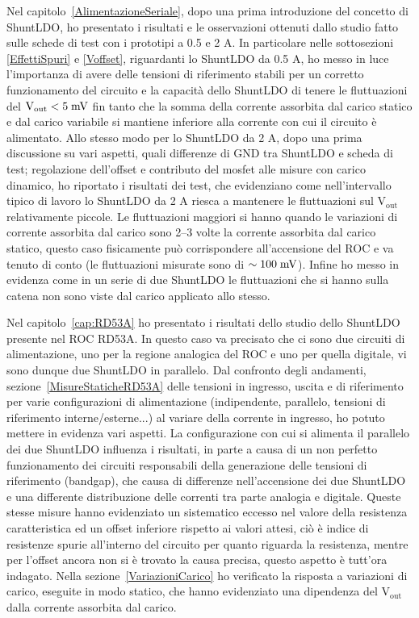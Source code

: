Nel capitolo~\ref{AlimentazioneSeriale}, dopo una prima introduzione del concetto di ShuntLDO, ho presentato i risultati e le osservazioni ottenuti dallo studio fatto sulle schede di test con i prototipi a 0.5 e 2 A. 
In particolare nelle sottosezioni \ref{EffettiSpuri} e \ref{Voffset}, riguardanti lo ShuntLDO da 0.5 A, ho messo in luce l'importanza di avere delle tensioni di riferimento stabili per un corretto funzionamento del circuito e la capacità dello ShuntLDO di tenere le fluttuazioni del $\mathrm{V_{out}<5 \rm \; mV}$ fin tanto che la somma della corrente assorbita dal carico statico e dal carico variabile si mantiene inferiore alla corrente con cui il circuito è alimentato. 
Allo stesso modo per lo ShuntLDO da 2 A, dopo una prima discussione su vari aspetti, quali differenze di GND tra ShuntLDO e scheda di test; regolazione dell'offset e contributo del mosfet alle misure con carico dinamico, ho riportato i risultati dei test, che evidenziano come nell'intervallo tipico di lavoro lo ShuntLDO da 2 A riesca a mantenere le fluttuazioni sul $\mathrm{V_{out}}$ relativamente piccole. 
Le fluttuazioni maggiori si hanno quando le variazioni di corrente assorbita dal carico sono 2--3 volte la corrente assorbita dal carico statico, questo caso fisicamente può corrispondere all'accensione del ROC e va tenuto di conto (le fluttuazioni misurate sono di $\sim 100 \rm \; mV$). 
Infine ho messo in evidenza come in un serie di due ShuntLDO le fluttuazioni che si hanno sulla catena non sono viste dal carico applicato allo stesso.

Nel capitolo~\ref{cap:RD53A} ho presentato i risultati dello studio dello ShuntLDO presente nel ROC RD53A. In questo caso va precisato che ci sono due circuiti di alimentazione, uno per la regione analogica del ROC e uno per quella digitale, vi sono dunque due ShuntLDO in parallelo. 
Dal confronto degli andamenti, sezione~\ref{MisureStaticheRD53A} delle tensioni in ingresso, uscita e di riferimento per varie configurazioni di alimentazione (indipendente, parallelo, tensioni di riferimento interne/esterne...) al variare della corrente in ingresso, ho potuto mettere in evidenza vari aspetti. 
La configurazione con cui si alimenta il parallelo dei due ShuntLDO influenza i risultati, in parte a causa di un non perfetto funzionamento dei circuiti responsabili della generazione delle tensioni di riferimento (bandgap), che causa di differenze nell'accensione dei due ShuntLDO e una differente distribuzione delle correnti tra parte analogia e digitale. 
Queste stesse misure hanno evidenziato un sistematico eccesso nel valore della resistenza caratteristica ed un offset inferiore  rispetto ai valori attesi, ciò è indice di resistenze spurie all'interno del circuito per quanto riguarda la resistenza, mentre per l'offset ancora non si è trovato la causa precisa, questo aspetto è tutt'ora indagato. 
Nella sezione~\ref{VariazioniCarico} ho verificato la risposta a variazioni di carico, eseguite in modo statico, che hanno evidenziato una dipendenza del $\mathrm{V_{out}}$ dalla corrente assorbita dal carico. %

